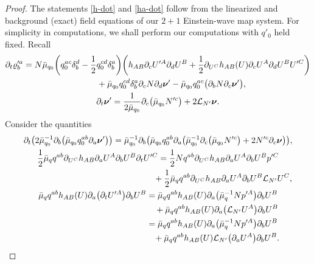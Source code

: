 \documentclass[pdftex]{sigma}
\def\ptl{\partial}%
\def\mbo#1{\boldsymbol{#1}}%
\def\halb{\frac{1}{2}}%
\numberwithin{equation}{section}
\begin{document}
\begin{proof}
The statements \eqref{h-dot} and \eqref{ha-dot} follow from the linearized and background (exact) field equations of our $2+1$ Einstein-wave map system. For simplicity in computations, we shall perform our computations with $q'_0$
held fixed. Recall
\begin{gather*}
\ptl_t \varrho'^a_b = N \bar{\mu}_{q_0} \biggl(q^{ac}_0 \delta^d_b - \halb q_0^{cd} \delta^a_b\biggr) \biggl(h_{AB} \ptl_c U'^A \ptl_d U^B + \halb \ptl_{U^C} h_{AB} (U) \ptl_c U^A \ptl_d U^B U'^C\biggr) \notag\\ \hphantom{\ptl_t \varrho'^a_b =}{}
+ \bar{\mu}_{q_0} q_0^{cd} \delta^a_b \ptl_c N \ptl_d \mbo{\nu}' - \bar{\mu}_{q_0} q^{ac}_0 \bigl(\ptl_b N \ptl_c \mbo{\nu}'\bigr), \\
\ptl_t \mbo{\nu}'= \frac{1}{2 \bar{\mu}_{q_0}} \ptl_c \bigl(\bar{\mu}_{q_0} N'^c\bigr) + 2 \mathcal{L}_{N'} \mbo{\nu}.
\end{gather*}
Consider the quantities
\begin{gather*}
\ptl_t \bigl(2 \bar{\mu}^{-1}_{q_0} \ptl_b \bigl(\bar{\mu}_{q_0} q^{ab}_0 \ptl_a \mbo{\nu}'\bigr) \bigr) = \bar{\mu}^{-1}_{q_0} \ptl_b \bigl(\bar{\mu}_{q_0} q^{ab}_0 \ptl_a \bigl( \bar{\mu}^{-1}_{q_0} \ptl_c \bigl(\bar{\mu}_{q_0} N'^c\bigr) + 2 N'^c\ptl_c \mbo{\nu}\bigr)\bigr),
\\
\halb \bar{\mu}_q q^{ab} \ptl_{U^C} h_{AB} \ptl_a U^A \ptl_b U^B \ptl_t U'^C = \halb N q^{ab} \ptl_{U^C} h_{AB} \ptl_a U^A \ptl_b U^B p'^C \notag\\
\hphantom{\halb \bar{\mu}_q q^{ab} \ptl_{U^C} h_{AB} \ptl_a U^A \ptl_b U^B \ptl_t U'^C =}{}
+ \halb \bar{\mu}_q q^{ab} \ptl_{U^C} h_{AB} \ptl_a U^A \ptl_b U^B \mathcal{L}_{N'} U^C, \\
 \bar{\mu}_q q^{ab} h_{AB}(U) \ptl_a \bigl(\ptl_t U'^A\bigr) \ptl_b U^B= \bar{\mu}_q q ^{ab} h_{AB}(U) \ptl_a \bigl(\bar{\mu}^{-1}_q N p'^A\bigr)
 \ptl_b U^B \notag\\ \hphantom{\bar{\mu}_q q^{ab} h_{AB}(U) \ptl_a \bigl(\ptl_t U'^A\bigr) \ptl_b U^B=}{}
 + \bar{\mu}_q q ^{ab} h_{AB}(U) \ptl_a \bigl(\mathcal{L}_{N'} U^A\bigr) \ptl_b U^B
 \notag\\ \hphantom{\bar{\mu}_q q^{ab} h_{AB}(U) \ptl_a \bigl(\ptl_t U'^A\bigr) \ptl_b U^B}{}
 = \bar{\mu}_q q ^{ab} h_{AB}(U) \ptl_a \bigl(\bar{\mu}^{-1}_q N p'^A\bigr)\ptl_b U^B
 \notag\\ \hphantom{\bar{\mu}_q q^{ab} h_{AB}(U) \ptl_a \bigl(\ptl_t U'^A\bigr) \ptl_b U^B=}{}
 + \bar{\mu}_q q ^{ab} h_{AB}(U) \mathcal{L}_{N'} \bigl(\ptl_a U^A\bigr) \ptl_b U^B.

\end{gather*}
\end{proof}
\end{document}
